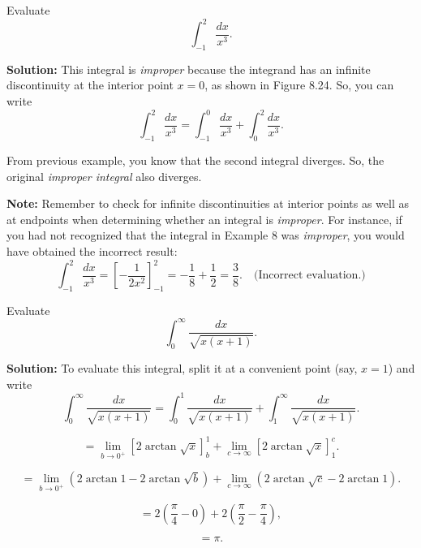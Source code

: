 \documentclass[12pt]{article}
\theoremstyle{beautifulthm}
\begin{document}
\begin{tcolorbox}[colback=examplebg, colframe=red!75!black, title=\textbf{EXAMPLE 4: An Improper Integral with an Interior Discontinuity}, fonttitle=\bfseries, sharp corners]
Evaluate
\[
\int_{-1}^2 \frac{dx}{x^3}.
\]


\tcblower
\textbf{Solution:} 
This integral is \textit{improper} because the integrand has an infinite discontinuity at the interior point $x = 0$, as shown in Figure 8.24. So, you can write
\[
\int_{-1}^2 \frac{dx}{x^3} = \int_{-1}^0 \frac{dx}{x^3} + \int_0^2 \frac{dx}{x^3}.
\]

From previous example, you know that the second integral diverges. So, the original \textit{improper integral} also diverges.

\textbf{Note:} Remember to check for infinite discontinuities at interior points as well as at endpoints when determining whether an integral is \textit{improper}. For instance, if you had not recognized that the integral in Example 8 was \textit{improper}, you would have obtained the incorrect result:
\[
\int_{-1}^2 \frac{dx}{x^3} = \left[ -\frac{1}{2x^2} \right]_{-1}^2 = -\frac{1}{8} + \frac{1}{2} = \frac{3}{8}. \quad \text{(Incorrect evaluation.)}
\]
\end{tcolorbox}

\begin{tcolorbox}[colback=examplebg, colframe=red!75!black, title=\textbf{EXAMPLE 5: Find the Integral of the Function}, fonttitle=\bfseries, sharp corners]
Evaluate
\[
\int_0^\infty \frac{dx}{\sqrt{x(x + 1)}}.
\]


\tcblower
\textbf{Solution:} 
To evaluate this integral, split it at a convenient point (say, $x = 1$) and write
\[
\int_0^\infty \frac{dx}{\sqrt{x(x + 1)}} = \int_0^1 \frac{dx}{\sqrt{x(x + 1)}} + \int_1^\infty \frac{dx}{\sqrt{x(x + 1)}}.
\]

\[
= \lim_{b \to 0^+} \left[ 2 \arctan \sqrt{x} \right]_b^1 + \lim_{c \to \infty} \left[ 2 \arctan \sqrt{x} \right]_1^c.
\]

\[
= \lim_{b \to 0^+} \left( 2 \arctan 1 - 2 \arctan \sqrt{b} \right) + \lim_{c \to \infty} \left( 2 \arctan \sqrt{c} - 2 \arctan 1 \right).
\]

\[
= 2 \left( \frac{\pi}{4} - 0 \right) + 2 \left( \frac{\pi}{2} - \frac{\pi}{4} \right),
\]

\[
= \pi.
\]

\end{tcolorbox}

\newpage
\end{document}
